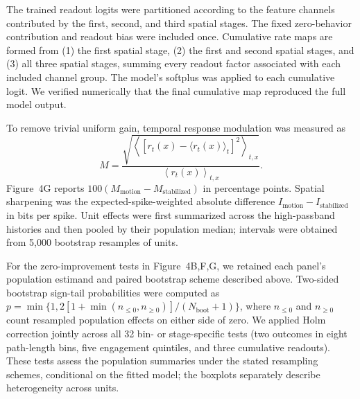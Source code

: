 \documentclass{lite}
\begin{document}
The trained readout logits were partitioned according to the feature channels contributed by the first, second, and third spatial stages. The fixed zero-behavior contribution and readout bias were included once. Cumulative rate maps are formed from (1) the first spatial stage, (2) the first and second spatial stages, and (3) all three spatial stages, summing every readout factor associated with each included channel group. The model's softplus was applied to each cumulative logit. We verified numerically that the final cumulative map reproduced the full model output.

To remove trivial uniform gain, temporal response modulation was measured as
\begin{equation}
M =
\frac{
\sqrt{\left\langle
       [r_t(x)-\langle r_t(x)\rangle_t]^2
       \right\rangle_{t,x}}
}{
\left\langle r_t(x)\right\rangle_{t,x}
}.
\end{equation}
Figure~4G reports $100(M_{\mathrm{motion}}-M_{\mathrm{stabilized}})$ in percentage points. Spatial sharpening was the expected-spike-weighted absolute difference
$I_{\mathrm{motion}}-I_{\mathrm{stabilized}}$ in bits per spike. Unit effects were first summarized across the high-passband histories and then pooled by their population median; intervals were obtained from 5{,}000 bootstrap resamples of units.

For the zero-improvement tests in Figure~4B,F,G, we retained each panel's population estimand and paired bootstrap scheme described above. Two-sided bootstrap sign-tail probabilities were computed as $p=\min\{1,2[1+\min(n_{\leq0},n_{\geq0})]/(N_{\mathrm{boot}}+1)\}$, where $n_{\leq0}$ and $n_{\geq0}$ count resampled population effects on either side of zero. We applied Holm correction jointly across all 32 bin- or stage-specific tests (two outcomes in eight path-length bins, five engagement quintiles, and three cumulative readouts). These tests assess the population summaries under the stated resampling schemes, conditional on the fitted model; the boxplots separately describe heterogeneity across units.
\end{document}

